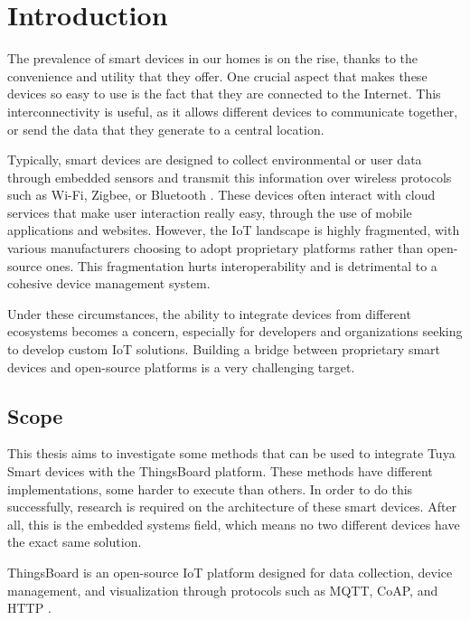 
\chapter{Introduction}

The prevalence of smart devices in our homes is on the rise, thanks to the convenience and utility that they offer. One crucial aspect that makes these devices so easy to use is the fact that they are connected to the Internet. This interconnectivity is useful, as it allows different devices to communicate together, or send the data that they generate to a central location.

Typically, smart devices are designed to collect environmental or user data through embedded sensors and transmit this information over wireless protocols such as Wi-Fi, Zigbee, or Bluetooth \cite{faludiHowIoTDevices}. These devices often interact with cloud services that make user interaction really easy, through the use of mobile applications and websites. However, the IoT landscape is highly fragmented, with various manufacturers choosing to adopt proprietary platforms rather than open-source ones. This fragmentation hurts interoperability and is detrimental to a cohesive device management system.

Under these circumstances, the ability to integrate devices from different ecosystems becomes a concern, especially for developers and organizations seeking to develop custom IoT solutions. Building a bridge between proprietary smart devices and open-source platforms is a very challenging target.

\section{Scope}

This thesis aims to investigate some methods that can be used to integrate Tuya Smart devices with the ThingsBoard platform. These methods have different implementations, some harder to execute than others. In order to do this successfully, research is required on the architecture of these smart devices. After all, this is the embedded systems field, which means no two different devices have the exact same solution.

ThingsBoard is an open-source IoT platform designed for data collection, device management, and visualization through protocols such as MQTT, CoAP, and HTTP \cite{thethingsboardauthorsWhatThingsBoard}.

